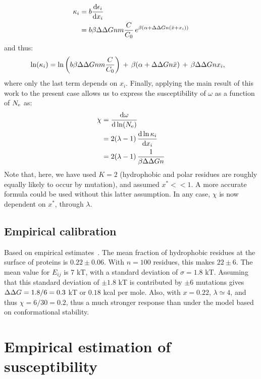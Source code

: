 \begin{align}
\kappa_i & = b \frac{\mathrm{d}\epsilon_i} {\mathrm{d} x_i}
\\ & =
b \beta \Delta \Delta G n m \frac{C}{C_0} \, e^{\beta (\alpha +\Delta \Delta G n (\bar x + x_i))}
\end{align}
and thus:
\begin{align}
\ln (\kappa_i) & = \ln \left( b \beta \Delta \Delta G n m \frac{C}{C_0}  \right) \, + \, \beta (\alpha +\Delta \Delta G n \bar x) \, + \, \beta \Delta \Delta Gn x_i,
\end{align}
where only the last term depends on $x_i$.
Finally, applying the main result of this work to the present case allows us to express the susceptibility of $\omega$ as a function of $N_{\mathrm{e}}$ as:
\begin{align}
\chi & = \frac{\mathrm{d}\omega} {\mathrm{d} \ln (N_{\mathrm{e}})}
\\ & =  2(\lambda - 1) \, \frac{\mathrm{d}\ln \kappa_i}{\mathrm{d} x_i}
\\ & =  2 (\lambda - 1) \, \frac{1}{\beta \Delta \Delta G n}
\end{align}
Note that, here, we have used $K=2$ (hydrophobic and polar residues are roughly equally likely to occur by mutation), and assumed $x^* << 1$. A more accurate formula could be used without this latter assumption. In any case, $\chi$ is now dependent on $x^*$, through $\lambda$.

\subsection{Empirical calibration}
\label{subsec:empirical-calibration}

Based on empirical estimates~\citep{Zhang2008}.
The mean fraction of hydrophobic residues at the surface of proteins is $0.22 \pm 0.06$. With $n=100$ residues, this makes $22 \pm 6$.
The mean value for $E_{ij}$ is 7 kT, with a standard deviation of $\sigma = 1.8$ kT. Assuming that this standard deviation of $\pm 1.8$ kT is contributed by $\pm 6$ mutations gives $\Delta \Delta G = 1.8 / 6 = 0.3$ kT or $0.18$ kcal per mole.
Also, with $x=0.22$, $\lambda \simeq 4$, and thus $\chi = 6  / 30 = 0.2$, thus a much stronger response than under the model based on conformational stability.

\section{Empirical estimation of susceptibility}
\label{sec:empirical-estimation-of-susceptibility}

